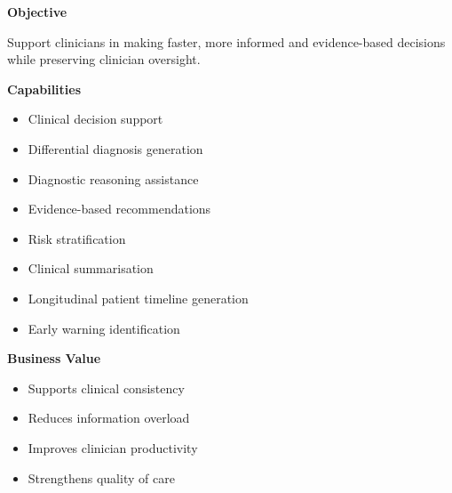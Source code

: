 \begin{capability}

\textbf{Objective}

Support clinicians in making faster, more informed and evidence-based decisions while preserving clinician oversight.

\vspace{3mm}

\textbf{Capabilities}

\begin{itemize}

\item Clinical decision support

\item Differential diagnosis generation

\item Diagnostic reasoning assistance

\item Evidence-based recommendations

\item Risk stratification

\item Clinical summarisation

\item Longitudinal patient timeline generation

\item Early warning identification

\end{itemize}

\vspace{3mm}

\textbf{Business Value}

\begin{itemize}

\item Supports clinical consistency

\item Reduces information overload

\item Improves clinician productivity

\item Strengthens quality of care

\end{itemize}

\end{capability}



